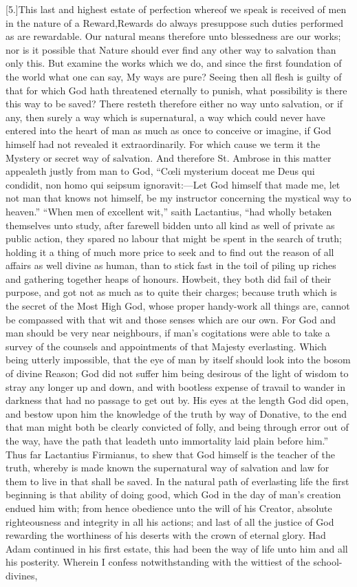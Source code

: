 [5.]This last and highest estate of perfection whereof we speak is received of men in the nature of a Reward,Rewards do always presuppose such duties performed as are rewardable. Our natural means therefore unto blessedness are our works; nor is it possible that Nature should ever find any other way to salvation than only this. But examine the works which we do, and since the first foundation of the world what one can say, My ways are pure? Seeing then all flesh is guilty of that for which God hath threatened eternally to punish, what possibility is there this way to be saved? There resteth therefore either no way unto salvation, or if any, then surely a way which is supernatural, a way which could never have entered into the heart of man as much as once to conceive or imagine, if God himself had not revealed it extraordinarily. For which cause we term it the Mystery or secret way of salvation. And therefore St. Ambrose in this matter appealeth justly from man to God, “Cœli mysterium doceat me Deus qui condidit, non homo qui seipsum ignoravit:—Let God himself that made me, let not man that knows not himself, be my instructor concerning the mystical way to heaven.” “When men of excellent wit,” saith Lactantius, “had wholly betaken themselves unto study, after farewell bidden unto all kind as well of private as public action, they spared no labour that might be spent in the  search of truth; holding it a thing of much more price to seek and to find out the reason of all affairs as well divine as human, than to stick fast in the toil of piling up riches and gathering together heaps of honours. Howbeit, they both did fail of their purpose, and got not as much as to quite their charges; because truth which is the secret of the Most High God, whose proper handy-work all things are, cannot be compassed with that wit and those senses which are our own. For God and man should be very near neighbours, if man’s cogitations were able to take a survey of the counsels and appointments of that Majesty everlasting. Which being utterly impossible, that the eye of man by itself should look into the bosom of divine Reason; God did not suffer him being desirous of the light of wisdom to stray any longer up and down, and with bootless expense of travail to wander in darkness that had no passage to get out by. His eyes at the length God did open, and bestow upon him the knowledge of the truth by way of Donative, to the end that man might both be clearly convicted of folly, and being through error out of the way, have the path that leadeth unto immortality laid plain before him.” Thus far Lactantius Firmianus, to shew that God himself is the teacher of the truth, whereby is made known the supernatural way of salvation and law for them to live in that shall be saved. In the natural path of everlasting life the first beginning is that  ability of doing good, which God in the day of man’s creation endued him with; from hence obedience unto the will of his Creator, absolute righteousness and integrity in all his actions; and last of all the justice of God rewarding the worthiness of his deserts with the crown of eternal glory. Had Adam continued in his first estate, this had been the way of life unto him and all his posterity. Wherein I confess notwithstanding with the wittiest of the school-divines, 